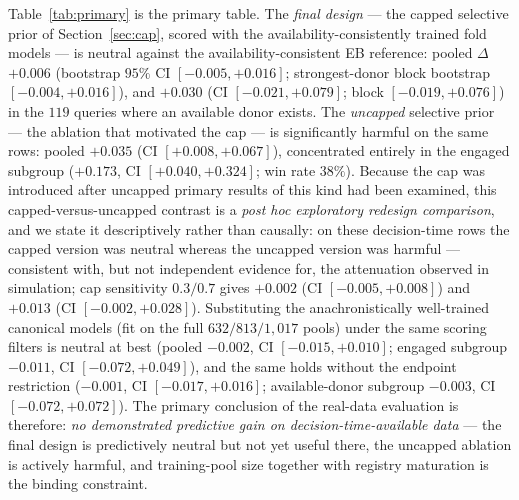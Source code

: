 \documentclass[11pt]{article}
\begin{document}
Table~\ref{tab:primary} is the primary table. The \emph{final design} --- the
capped selective prior of Section~\ref{sec:cap}, scored with the
availability-consistently trained fold models --- is neutral against the
availability-consistent EB reference: pooled $\Delta$ $+0.006$
(bootstrap $95\%$ CI $[-0.005, +0.016]$; strongest-donor block bootstrap
$[-0.004, +0.016]$), and $+0.030$ (CI $[-0.021, +0.079]$; block
$[-0.019, +0.076]$) in the $119$ queries where an available donor exists.
The \emph{uncapped} selective prior --- the ablation that motivated the cap
--- is significantly harmful on the same rows: pooled $+0.035$
(CI $[+0.008, +0.067]$), concentrated entirely in the engaged subgroup
($+0.173$, CI $[+0.040, +0.324]$; win rate $38\%$). Because the cap was
introduced after uncapped primary results of this kind had been examined,
this capped-versus-uncapped contrast is a \emph{post hoc exploratory
redesign comparison}, and we state it descriptively rather than causally:
on these decision-time rows the capped version was neutral whereas the
uncapped version was harmful --- consistent with, but not independent
evidence for, the attenuation observed in simulation; cap sensitivity
$0.3/0.7$ gives $+0.002$ (CI $[-0.005,+0.008]$) and $+0.013$
(CI $[-0.002,+0.028]$). Substituting the anachronistically well-trained
canonical models (fit on the full $632/813/1{,}017$ pools) under the same
scoring filters is neutral at best (pooled $-0.002$, CI $[-0.015, +0.010]$;
engaged subgroup $-0.011$, CI $[-0.072, +0.049]$), and the same holds
without the endpoint restriction ($-0.001$, CI $[-0.017, +0.016]$;
available-donor subgroup $-0.003$, CI $[-0.072, +0.072]$). The primary
conclusion of the real-data evaluation is therefore: \emph{no demonstrated
predictive gain on decision-time-available data} --- the final design is
predictively neutral but not yet useful there, the uncapped ablation is
actively harmful,
and training-pool size together with registry maturation is the binding
constraint.
\end{document}
